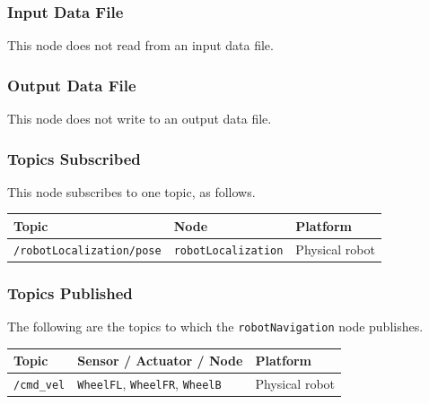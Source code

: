 \documentclass{CSSRforAfrica}
\begin{document}
{{\subsubsection*{Input Data File}
This node does not read from an input data file.


\subsubsection*{Output Data File}
This node does not write to an output data file.


\subsubsection*{Topics Subscribed}
This node  subscribes to one topic, as follows.

\begin{center}
\begin{tabularx}{\linewidth}{| l | l | X|}
\hline 
{\small Topic }                               & {\small Node }                            &  {\small Platform}       \\
\hline
{\footnotesize \verb+/robotLocalization/pose+ }  & {\footnotesize \verb+robotLocalization+}    & {\footnotesize Physical robot } \\
\hline
\end{tabularx}
\end{center}


\subsubsection*{Topics Published}

The following are the topics to which the {\small \verb+robotNavigation+} node publishes.

\begin{center}
\begin{tabularx}{\linewidth}{| l | l | X|}
\hline 
{\small Topic }                                                                & {\small Sensor / Actuator / Node}    &  {\small Platform}       \\
\hline
{\footnotesize \verb+/cmd_vel+ }  & {\footnotesize \verb+WheelFL+, \verb+WheelFR+, \verb+WheelB+ } & {\small Physical robot } \\  
\hline
\end{tabularx}
\end{center}


}}
\end{document}

